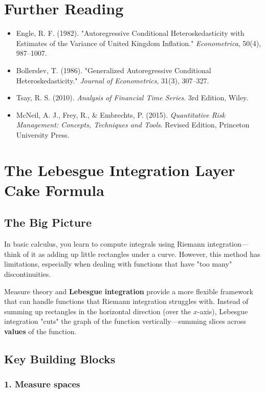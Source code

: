 \documentclass[11pt]{amsart}
\begin{document}
\section*{Further Reading}
\begin{itemize}
	\item Engle, R. F. (1982). "Autoregressive Conditional Heteroskedasticity with Estimates of the Variance of United Kingdom Inflation." \emph{Econometrica}, 50(4), 987–1007.
	\item Bollerslev, T. (1986). "Generalized Autoregressive Conditional Heteroskedasticity." \emph{Journal of Econometrics}, 31(3), 307–327.
	\item Tsay, R. S. (2010). \emph{Analysis of Financial Time Series}. 3rd Edition, Wiley.
	\item McNeil, A. J., Frey, R., \& Embrechts, P. (2015). \emph{Quantitative Risk Management: Concepts, Techniques and Tools}. Revised Edition, Princeton University Press.
\end{itemize}

\appendix
\section{The Lebesgue Integration Layer Cake Formula}

\subsection*{The Big Picture}

In basic calculus, you learn to compute integrals using Riemann integration—think of it as adding up little rectangles under a curve. However, this method has limitations, especially when dealing with functions that have "too many" discontinuities.

Measure theory and \textbf{Lebesgue integration} provide a more flexible framework that can handle functions that Riemann integration struggles with. Instead of summing up rectangles in the horizontal direction (over the $x$-axis), Lebesgue integration "cuts" the graph of the function vertically—summing slices across \textbf{values} of the function.

\subsection*{Key Building Blocks}

\subsubsection*{1. Measure spaces}
\end{document}
